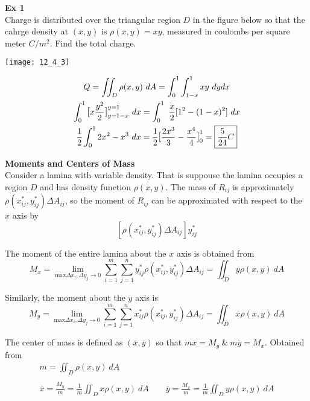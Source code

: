 \documentclass{article}
\begin{document}
   \textbf{Ex 1}\\
   Charge is distributed over the triangular region $ D $ in the figure below so that the cahrge density at $ (x,y) $ is $ \rho(x,y)=xy $, measured in coulombs per square meter $ C/m^{2} $. Find the total charge.

   \begin{center}
       \texttt{[image: 12\_4\_3]}
   \end{center}

   \[
       \begin{gathered}
       Q = \iint_D \rho(x,y) ~dA = \int^{1}_{0} \int^{1}_{1-x} xy ~ dydx\\
       \int^{1}_{0} \text{\large{[}} x\frac{y^{2}}{2}  \text{\large{]}}^{y=1}_{y=1-x}~dx = \int^{1}_{0} ~ \frac{x}{2}  [1^{2}-(1-x)^{2} ]~dx\\
     \frac{1}{2} \int^{1}_{0} 2x^{2}-x^{3} ~dx=\frac{1}{2} \text{\large{[}} \frac{2x^{3}}{3}-\frac{x^{4}}{4} \text{\large{]}}^{1}_{0}=\boxed{\frac{5}{24}C}  
       \end{gathered}
   \]

  \textbf{Moments and Centers of Mass}\\
  Consider a lamina with variable density. That is suppouse the lamina occupies a region $ D $ and has density function $ \rho(x,y) $. The mass of $ R_{ij} $ is approximately $ \rho(x^{*}_{ij},y^{*}_{ij})\Delta A_{ij} $, so the moment of $ R_{ij} $ can be approximated with respect to the $ x $ axis by
  \[
    [\rho(x^{*}_{ij},y^{*}_{ij})\Delta A_{ij}]y^{*}_{ij}
  \]
  
  The moment of the entire lamina about the $ x $ axis is obtained from
  \[
    M_x = \lim_{\text{max} \Delta x_i,\Delta y_j \to 0}\sum^{m}_{i=1}\sum^{n}_{j=1}y^{*}_{ij} \rho(x^{*}_{ij},y^{*}_{ij})\Delta A_{ij} = \iint_D y\rho(x,y)~dA
  \]
  
  Similarly, the moment about the $ y $ axis is
  \[
  M_y=\lim_{\text{max}\Delta x_{i}, \Delta y_{j} \to 0} \sum^{m}_{i=1}\sum^{n}_{j=1}x^{*}_{ij}\rho(x^{*}_{ij},y^{*}_{ij})\Delta A_{ij}=\iint_D x\rho(x,y)~dA
  \]
  
  The center of mass is defined as $ (\overline{x},\overline{y}) $ so that $ m\overline{x}=M_y ~\&~ m\overline{y}=M_x $. Obtained from
  \[
    \begin{gathered}
    m=\iint_D \rho(x,y)~dA\\
    ~\\
    \overline{x}=\frac{M_y}{m}=\frac{1}{m}\iint_D x\rho(x,y)~dA \qquad \overline{y}=\frac{M_x}{m}=\frac{1}{m}\iint_D y\rho(x,y)~dA\\
    \end{gathered}
  \]
\end{document}

